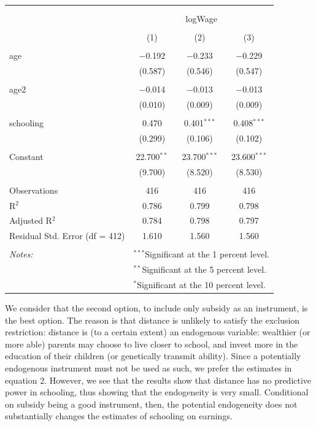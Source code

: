 \documentclass[
]{article}
\begin{document}
\begin{table}[!htbp] \centering 
  \caption{} 
  \label{} 
\small 
\begin{tabular}{@{\extracolsep{5pt}}lccc} 
\\[-1.8ex]\hline 
\hline \\[-1.8ex] 
\\[-1.8ex] & \multicolumn{3}{c}{logWage} \\ 
\\[-1.8ex] & (1) & (2) & (3)\\ 
\hline \\[-1.8ex] 
 age & $-$0.192 & $-$0.233 & $-$0.229 \\ 
  & (0.587) & (0.546) & (0.547) \\ 
  & & & \\ 
 age2 & $-$0.014 & $-$0.013 & $-$0.013 \\ 
  & (0.010) & (0.009) & (0.009) \\ 
  & & & \\ 
 schooling & 0.470 & 0.401$^{***}$ & 0.408$^{***}$ \\ 
  & (0.299) & (0.106) & (0.102) \\ 
  & & & \\ 
 Constant & 22.700$^{**}$ & 23.700$^{***}$ & 23.600$^{***}$ \\ 
  & (9.700) & (8.520) & (8.530) \\ 
  & & & \\ 
Observations & 416 & 416 & 416 \\ 
R$^{2}$ & 0.786 & 0.799 & 0.798 \\ 
Adjusted R$^{2}$ & 0.784 & 0.798 & 0.797 \\ 
Residual Std. Error (df = 412) & 1.610 & 1.560 & 1.560 \\ 
\hline \\[-1.8ex] 
\textit{Notes:} & \multicolumn{3}{l}{$^{***}$Significant at the 1 percent level.} \\ 
 & \multicolumn{3}{l}{$^{**}$Significant at the 5 percent level.} \\ 
 & \multicolumn{3}{l}{$^{*}$Significant at the 10 percent level.} \\ 
\end{tabular} 
\end{table}

We consider that the second option, to include only subsidy as an
instrument, is the best option. The reason is that distance is unlikely
to satisfy the exclusion restriction: distance is (to a certain extent)
an endogenous variable: wealthier (or more able) parents may choose to
live closer to school, and invest more in the education of their
children (or genetically transmit ability). Since a potentially
endogenous instrument must not be used as such, we prefer the estimates
in equation 2. However, we see that the results show that distance has
no predictive power in schooling, thus showing that the endogeneity is
very small. Conditional on subsidy being a good instrument, then, the
potential endogeneity does not substantially changes the estimates of
schooling on earnings.
\end{document}
